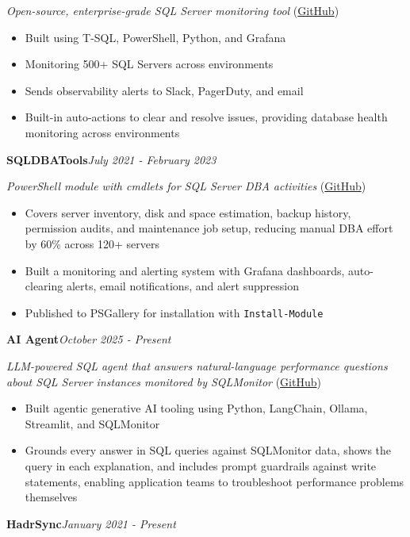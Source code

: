 \documentclass[10pt,a4paper]{article}
\begin{document}
\textit{Open-source, enterprise-grade SQL Server monitoring tool} (\href{https://github.com/imajaydwivedi/SQLMonitor}{GitHub})
\begin{itemize}
  \item Built using T-SQL, PowerShell, Python, and Grafana
  \item Monitoring 500+ SQL Servers across environments
  \item Sends observability alerts to Slack, PagerDuty, and email
  \item Built-in auto-actions to clear and resolve issues, providing database health monitoring across environments
\end{itemize}
\vspace{14.7pt}
\noindent\textbf{SQLDBATools}\hfill \textit{July 2021 - February 2023}

\textit{PowerShell module with cmdlets for SQL Server DBA activities} (\href{https://github.com/imajaydwivedi/SQLDBATools}{GitHub})
\begin{itemize}
  \item Covers server inventory, disk and space estimation, backup history, permission audits, and maintenance job setup, reducing manual DBA effort by 60\% across 120+ servers
  \item Built a monitoring and alerting system with Grafana dashboards, auto-clearing alerts, email notifications, and alert suppression
  \item Published to PSGallery for installation with \texttt{Install-Module}
\end{itemize}
\vspace{14.7pt}
\noindent\textbf{AI Agent}\hfill \textit{October 2025 - Present}

\textit{LLM-powered SQL agent that answers natural-language performance questions about SQL Server instances monitored by SQLMonitor} (\href{https://github.com/imajaydwivedi/SQLMonitor/tree/dev/AI-Agent}{GitHub})
\begin{itemize}
  \item Built agentic generative AI tooling using Python, LangChain, Ollama, Streamlit, and SQLMonitor
  \item Grounds every answer in SQL queries against SQLMonitor data, shows the query in each explanation, and includes prompt guardrails against write statements, enabling application teams to troubleshoot performance problems themselves
\end{itemize}
\vspace{14.7pt}
\noindent\textbf{HadrSync}\hfill \textit{January 2021 - Present}
\end{document}
